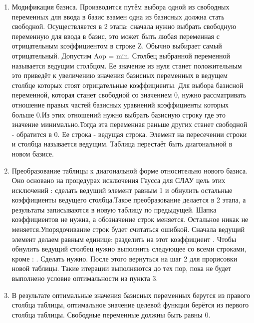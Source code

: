 \begin{enumerate}
  \item Модификация базиса. Производится путём выбора одной из свободных переменных для ввода в базис взамен одна из базисных должна стать свободной. Осуществляется в 2 этапа: сначала нужно выбрать свободную переменную для ввода в базис, это может быть любая переменная с отрицательным коэффициентом в строке Z. Обычно выбирает самый отрицательный. Допустим Aop = min. Столбец выбранной переменной называется ведущим столбцом. Ее значение из нуля станет положительным это приведёт к увеличению значения базисных переменных в ведущем столбце которых стоят отрицательные коэффициенты. Для выбора базисной переменной, которая станет свободной со значением 0, нужно рассматривать отношение правых частей базисных уравнений коэффициенты которых больше 0.Из этих отношений нужно выбрать базисную строку где это значение минимально.Тогда эта переменная раньше других станет свободной - обратится в 0. Ее строка - ведущая строка. Элемент на пересечении строки и столбца называется ведущим. Таблица перестаёт быть диагональной в новом базисе.
  \item Преобразование таблицы к диагональной форме относительно нового базиса. Оно основано на процедурах исключения Гаусса для СЛАУ цель этих исключений : сделать ведущий элемент равным 1 и обнулить остальные коэффициенты ведущего столбца.Такое преобразование делается в 2 этапа, а результаты записываются в новую таблицу по предыдущей. Шапка коэффициентов не нужна, а обозначение строк меняется. Остальное никак не меняется.Упорядочивание строк будет считаться ошибкой. Сначала ведущий элемент делаем равным единице: разделить на этот коэффициент . Чтобы обнулить ведущий столбец нужно выполнить следующее со всеми строками, кроме : . Сделать нужно. После этого вернуться на шаг 2 для прорисовки новой таблицы. Такие итерации выполняются до тех пор, пока не будет выполнено условие оптимальности из пункта 3.
\item В результате оптимальные значения базисных переменных берутся из правого столбца таблицы, оптимальное значение целевой функции берётся из первого столбца таблицы. Свободные переменные должны быть равны 0.

\end{enumerate}
